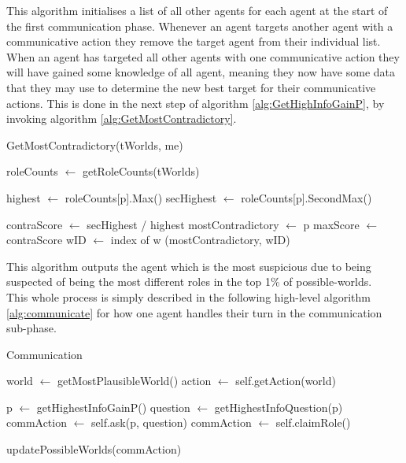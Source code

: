 \setcounter{algorithmcaption}{3}
This algorithm initialises a list of all other agents for each agent at the 
start of the first communication phase. Whenever an agent targets another agent 
with a communicative action they remove the target agent from their individual 
list. When an agent has targeted all other agents with one communicative action 
they will have gained some knowledge of all agent, meaning they now have some 
data that they may use to determine the new best target for their communicative 
actions. This is done in the next step of algorithm \ref{alg:GetHighInfoGainP}, 
by invoking algorithm \ref{alg:GetMostContradictory}.  
\begin{algorithm}[H]
	\caption{GetMostContradictory(tWorlds, me)}
	\begin{algorithmic}
		\State roleCounts $\gets$ getRoleCounts(tWorlds)
		
		\State highest $\gets$ roleCounts[p].Max()
		\State secHighest $\gets$ roleCounts[p].SecondMax()
		
		\State contraScore $\gets$ secHighest / highest
		\State mostContradictory $\gets$ p
		\State maxScore $\gets$ contraScore
		\State wID $\gets$ index of w
		\EndIf
		\EndFor
		\EndFor
		\State \Return (mostContradictory, wID)
	\end{algorithmic}\label{alg:GetMostContradictory}
\end{algorithm}
\setcounter{algorithmcaption}{4}
This algorithm outputs the agent which is the most suspicious due to being 
suspected of being the most different roles in the top 1\% of possible-worlds.\\
This whole process is simply described in the following high-level algorithm 
\ref{alg:communicate} for how one agent handles their turn in the communication 
sub-phase. 
\begin{algorithm}[H]
	\caption{Communication}
	\begin{algorithmic}[1]
		\State world $\gets$ getMostPlausibleWorld()
		\State action $\gets$ self.getAction(world)
		
		\State p $\gets$ getHighestInfoGainP()
		\State question $\gets$ getHighestInfoQuestion(p)
		\State commAction $\gets$ self.ask(p, question)
		\State commAction $\gets$ self.claimRole()
		\EndIf
		
		\State updatePossibleWorlds(commAction)
		\EndFunction
	\end{algorithmic}\label{alg:communicate}
\end{algorithm}
